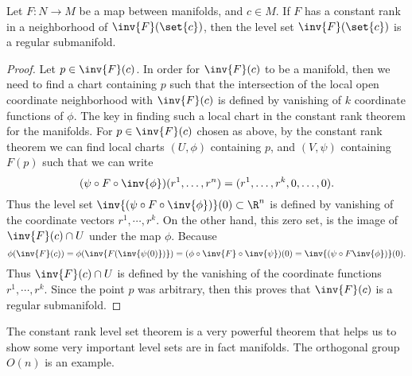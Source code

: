 \begin{proposition}
	Let $ F:N\to M $ be a map between manifolds, and $ c\in M $. If $ F $ has a constant rank in a neighborhood of $ \inv{F}(\set{c}) $, then the level set $ \inv{F}(\set{c}) $ is a regular submanifold.
\end{proposition}
\begin{proof}
	Let $ p \in \inv{F}(c) $. In order for $ \inv{F}(c) $ to be a manifold, then we need to find a chart containing $ p $ such that the intersection of the local open coordinate neighborhood with $ \inv{F}(c) $ is defined by vanishing of $ k $ coordinate functions of $ \phi $. The key in finding such a local chart in the constant rank theorem for the manifolds. For $ p \in \inv{F}(c) $ chosen as above, by the constant rank theorem we can find local charts $ (U,\phi) $ containing $ p $, and $ (V,\psi) $ containing $ F(p) $ such that we can write
	\[ (\psi\circ F \circ \inv{\phi}) (r^1,\dots,r^n) = (r^1,\dots,r^k,0,\dots,0). \]
	Thus the level set $ \inv{(\psi\circ F \circ \inv{\phi})}(0) \subset \R^n $ is defined by vanishing of the coordinate vectors $ r^1,\cdots,r^k $. On the other hand, this zero set, is the image of $ \inv{F}(c) \cap U $ under the map $ \phi $. Because
	\[ \phi(\inv{F}(c)) = \phi(\inv{F(\inv{\psi(0)})}) = (\phi\circ \inv{F} \circ \inv{\psi})(0) = \inv{(\psi\circ F \inv{\phi})}(0). \]
	Thus $ \inv{F}(c)\cap U $ is defined by the vanishing of the coordinate functions $ r^1,\cdots,r^k $. Since the point $ p  $ was arbitrary, then this proves that $ \inv{F}(c) $ is a regular submanifold.
\end{proof}
 
The constant rank level set theorem is a very powerful theorem that helps us to show some very important level sets are in fact manifolds. The orthogonal group $ O(n) $ is an example.

